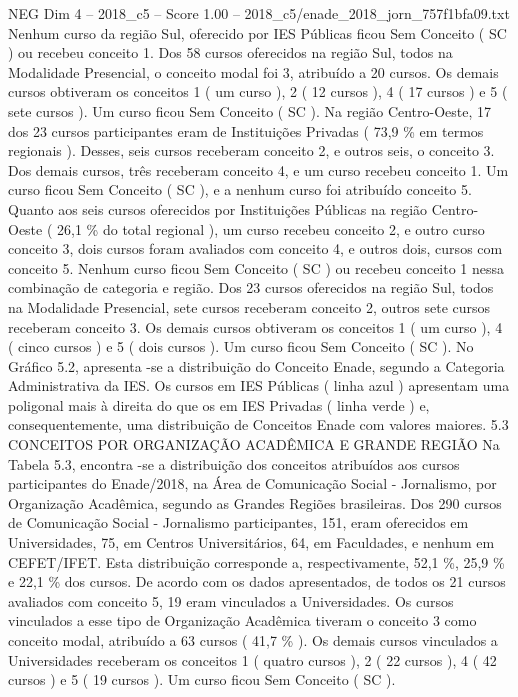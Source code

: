\begin{textsample}{NEG Dim 4 – 2018\_c5 – Score 1.00 – 2018\_c5/enade\_2018\_jorn\_757f1bfa09.txt}
Nenhum curso da região Sul, oferecido por IES Públicas ficou Sem Conceito ( SC ) ou recebeu conceito 1.
Dos 58 cursos oferecidos na região Sul, todos na Modalidade Presencial, o conceito modal foi 3, atribuído a 20 cursos.
Os demais cursos obtiveram os conceitos 1 ( um curso ), 2 ( 12 cursos ), 4 ( 17 cursos ) e 5 ( sete cursos ).
Um curso ficou Sem Conceito ( SC ).
Na região Centro-Oeste, 17 dos 23 cursos participantes eram de Instituições Privadas ( 73,9 \% em termos regionais ).
Desses, seis cursos receberam conceito 2, e outros seis, o conceito 3.
Dos demais cursos, três receberam conceito 4, e um curso recebeu conceito 1.
Um curso ficou Sem Conceito ( SC ), e a nenhum curso foi atribuído conceito 5.
Quanto aos seis cursos oferecidos por Instituições Públicas na região Centro-Oeste ( 26,1 \% do total regional ), um curso recebeu conceito 2, e outro curso conceito 3, dois cursos foram avaliados com conceito 4, e outros dois, cursos com conceito 5.
Nenhum curso ficou Sem Conceito ( SC ) ou recebeu conceito 1 nessa combinação de categoria e região.
Dos 23 cursos oferecidos na região Sul, todos na Modalidade Presencial, sete cursos receberam conceito 2, outros sete cursos receberam conceito 3.
Os demais cursos obtiveram os conceitos 1 ( um curso ), 4 ( cinco cursos ) e 5 ( dois cursos ).
Um curso ficou Sem Conceito ( SC ).
No Gráfico 5.2, apresenta -se a distribuição do Conceito Enade, segundo a Categoria Administrativa da IES.
Os cursos em IES Públicas ( linha azul ) apresentam uma poligonal mais à direita do que os em IES Privadas ( linha verde ) e, consequentemente, uma distribuição de Conceitos Enade com valores maiores. 5.3 CONCEITOS POR ORGANIZAÇÃO ACADÊMICA E GRANDE REGIÃO Na Tabela 5.3, encontra -se a distribuição dos conceitos atribuídos aos cursos participantes do Enade/2018, na Área de Comunicação Social - Jornalismo, por Organização Acadêmica, segundo as Grandes Regiões brasileiras.
Dos 290 cursos de Comunicação Social - Jornalismo participantes, 151, eram oferecidos em Universidades, 75, em Centros Universitários, 64, em Faculdades, e nenhum em CEFET/IFET.
Esta distribuição corresponde a, respectivamente, 52,1 \%, 25,9 \% e 22,1 \% dos cursos.
De acordo com os dados apresentados, de todos os 21 cursos avaliados com conceito 5, 19 eram vinculados a Universidades.
Os cursos vinculados a esse tipo de Organização Acadêmica tiveram o conceito 3 como conceito modal, atribuído a 63 cursos ( 41,7 \% ).
Os demais cursos vinculados a Universidades receberam os conceitos 1 ( quatro cursos ), 2 ( 22 cursos ), 4 ( 42 cursos ) e 5 ( 19 cursos ).
Um curso ficou Sem Conceito ( SC ).

\end{textsample}
